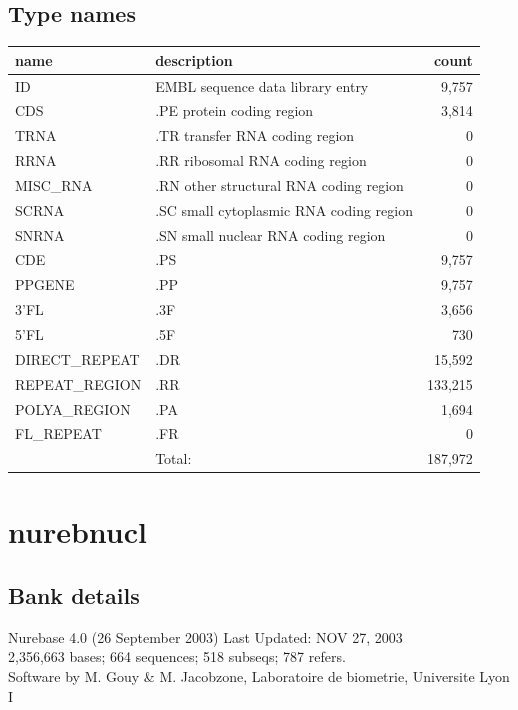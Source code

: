 \documentclass{article}
\begin{document}
\begin{Schunk}
\subsection{Type names}
\noindent\begin{tabular}{llr}
\hline \hline
name & description & count \\
\hline
ID  &  EMBL sequence data library entry  &  9,757 \\
CDS  &  .PE protein coding region  &  3,814 \\
TRNA  &  .TR transfer RNA coding region  &  0 \\
RRNA  &  .RR ribosomal RNA coding region  &  0 \\
MISC\_RNA  &  .RN other structural RNA coding region  &  0 \\
SCRNA  &  .SC small cytoplasmic RNA coding region  &  0 \\
SNRNA  &  .SN small nuclear RNA coding region  &  0 \\
CDE  &  .PS  &  9,757 \\
PPGENE  &  .PP  &  9,757 \\
3'FL  &  .3F  &  3,656 \\
5'FL  &  .5F  &  730 \\
DIRECT\_REPEAT  &  .DR  &  15,592 \\
REPEAT\_REGION  &  .RR  &  133,215 \\
POLYA\_REGION  &  .PA  &  1,694 \\
FL\_REPEAT  &  .FR  &  0 \\
\hline
 & Total: & 187,972 \\
\hline \hline
\end{tabular}

\section{ nurebnucl }
\subsection{Bank details}
Nurebase 4.0 (26 September 2003) Last Updated: NOV 27, 2003\\
2,356,663 bases; 664 sequences; 518 subseqs; 787 refers.\\
Software by M. Gouy \& M. Jacobzone, Laboratoire de biometrie, Universite Lyon I


\end{Schunk}
\end{document}
